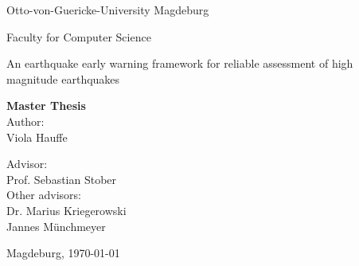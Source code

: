 \documentclass[thesis.tex]{subfiles}
\begin{document}
\thispagestyle {empty}


\begin{center}
	\begin{large}
		Otto-von-Guericke-University Magdeburg\\
		
		
		\vspace{1mm}
		
		\normalsize{Faculty for Computer Science}\\
	\end{large}
	
	

	\vspace{20mm}
		\begin{Huge}
			An earthquake early warning framework for reliable assessment of high magnitude earthquakes
			\\
		\end{Huge}
	\vspace{25mm}

	{\Huge \textbf{Master Thesis}}\\
	\vspace{25mm}
	Author:\\
	\vspace{2mm}
	{\Large Viola Hauffe}\\
	
	\vspace{20mm}
	
	Advisor:\\
	\vspace{1mm}
	{\large Prof. Sebastian Stober}\\
	\vspace{4mm}
	Other advisors:\\
	\vspace{1mm}
	{\large Dr. Marius Kriegerowski}\\
	{\large Jannes Münchmeyer}\\
	\vspace{10mm}
	
	
	{\large Magdeburg, \today}\\
	
	

\end{center}
\end{document}
